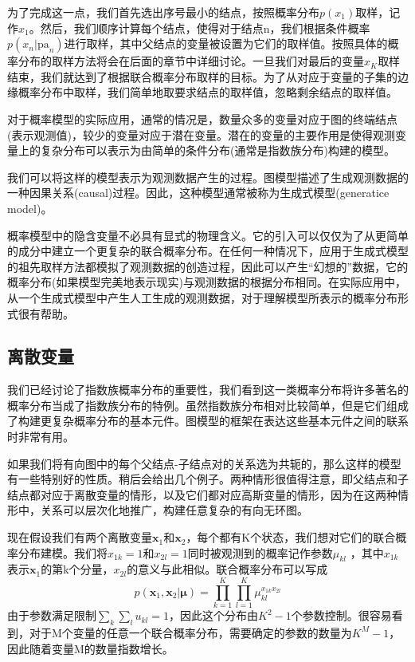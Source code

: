 为了完成这一点，我们首先选出序号最小的结点，按照概率分布$p(x_1)$取样，记作$\hat{x}_1$。然后，我们顺序计算每个结点，使得对于结点n，我们根据条件概率$p(x_n|\textrm{pa}_n)$进行取样，其中父结点的变量被设置为它们的取样值。按照具体的概率分布的取样方法将会在后面的章节中详细讨论。一旦我们对最后的变量$x_K$取样结束，我们就达到了根据联合概率分布取样的目标。为了从对应于变量的子集的边缘概率分布中取样，我们简单地取要求结点的取样值，忽略剩余结点的取样值。

对于概率模型的实际应用，通常的情况是，数量众多的变量对应于图的终端结点(表示观测值)，较少的变量对应于潜在变量。潜在的变量的主要作用是使得观测变量上的复杂分布可以表示为由简单的条件分布(通常是指数族分布)构建的模型。

我们可以将这样的模型表示为观测数据产生的过程。图模型描述了生成观测数据的一种因果关系(causal)过程。因此，这种模型通常被称为生成式模型(generatice model)。

概率模型中的隐含变量不必具有显式的物理含义。它的引入可以仅仅为了从更简单的成分中建立一个更复杂的联合概率分布。在任何一种情况下，应用于生成式模型的祖先取样方法都模拟了观测数据的创造过程，因此可以产生“幻想的”数据，它的概率分布(如果模型完美地表示现实)与观测数据的根据分布相同。在实际应用中，从一个生成式模型中产生人工生成的观测数据，对于理解模型所表示的概率分布形式很有帮助。
\subsection*{离散变量}
我们已经讨论了指数族概率分布的重要性，我们看到这一类概率分布将许多著名的概率分布当成了指数族分布的特例。虽然指数族分布相对比较简单，但是它们组成了构建更复杂概率分布的基本元件。图模型的框架在表达这些基本元件之间的联系时非常有用。

如果我们将有向图中的每个父结点-子结点对的关系选为共轭的，那么这样的模型有一些特别好的性质。稍后会给出几个例子。两种情形很值得注意，即父结点和子结点都对应于离散变量的情形，以及它们都对应高斯变量的情形，因为在这两种情形中，关系可以层次化地推广，构建任意复杂的有向无环图。

现在假设我们有两个离散变量$\boldsymbol{x}_1$和$\boldsymbol{x}_2$，每个都有K个状态，我们想对它们的联合概率分布建模。我们将$x_{1k}=1$和$x_{2l}=1$同时被观测到的概率记作参数$\mu_{kl}$
，其中$x_{1k}$表示$\boldsymbol{x}_1$的第k个分量，$x_{2l}$的意义与此相似。联合概率分布可以写成 
\begin{equation}
	p(\boldsymbol{x}_1,\boldsymbol{x}_2|\boldsymbol{\mu})=\prod_{k=1}^{K}\prod_{l=1}^{K}\mu_{kl}^{x_{1k}x_{2l}}
\end{equation}
由于参数满足限制$\sum_k\sum_l u_{kl}=1$，因此这个分布由$K^2-1$个参数控制。很容易看到，对于M个变量的任意一个联合概率分布，需要确定的参数的数量为$K^M-1$，因此随着变量M的数量指数增长。

